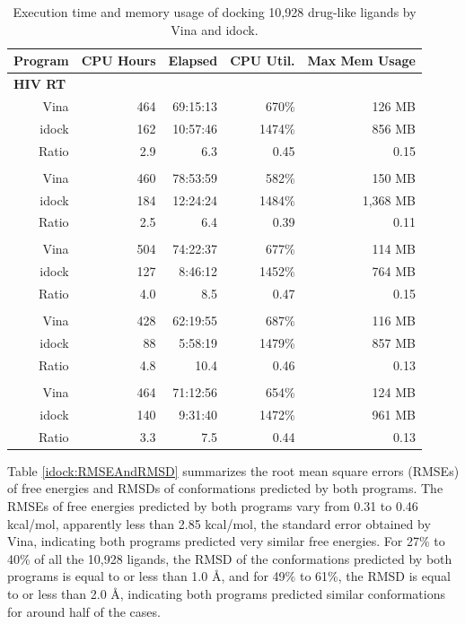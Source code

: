 \begin{table}
\centering
\begin{tabular*}
{\linewidth}
{@{\extracolsep{\fill}}rrrrr}
\toprule
Program & CPU Hours & Elapsed & CPU Util. & Max Mem Usage\\
\midrule
\multicolumn{5}{l}{\textbf{HIV RT}}\\
Vina  & 464 & 69:15:13 &  670\% & 126 MB\\
idock & 162 & 10:57:46 & 1474\% & 856 MB\\
Ratio & 2.9 &      6.3 & 0.45   & 0.15\\
\noalign{\smallskip\smallskip}
\multicolumn{5}{l}{\textbf{SAHH}}\\
Vina  & 460 & 78:53:59 &  582\% &   150 MB\\
idock & 184 & 12:24:24 & 1484\% & 1,368 MB\\
Ratio & 2.5 &      6.4 &  0.39  & 0.11\\
\noalign{\smallskip\smallskip}
\multicolumn{5}{l}{\textbf{ADA}}\\
Vina  & 504 & 74:22:37 &  677\% & 114 MB\\
idock & 127 &  8:46:12 & 1452\% & 764 MB\\
Ratio & 4.0 &      8.5 &  0.47  & 0.15\\
\noalign{\smallskip\smallskip}
\multicolumn{5}{l}{\textbf{PNP}}\\
Vina  & 428 & 62:19:55 &  687\% & 116 MB\\
idock &  88 &  5:58:19 & 1479\% & 857 MB\\
Ratio & 4.8 &     10.4 &  0.46  & 0.13\\
\noalign{\smallskip\smallskip}
\multicolumn{5}{l}{\textbf{Average}}\\
Vina  & 464 & 71:12:56 &  654\% & 124 MB\\
idock & 140 &  9:31:40 & 1472\% & 961 MB\\
Ratio & 3.3 &      7.5 & 0.44   & 0.13\\
\bottomrule
\end{tabular*}
\caption{Execution time and memory usage of docking 10,928 drug-like ligands by Vina and idock.}
\label{idock:ExecutionTimeAndMemoryUsage}
\end{table}

Table \ref{idock:RMSEAndRMSD} summarizes the root mean square errors (RMSEs) of free energies and RMSDs of conformations predicted by both programs. The RMSEs of free energies predicted by both programs vary from 0.31 to 0.46 kcal/mol, apparently less than 2.85 kcal/mol, the standard error obtained by Vina, indicating both programs predicted very similar free energies. For 27\% to 40\% of all the 10,928 ligands, the RMSD of the conformations predicted by both programs is equal to or less than 1.0 \AA, and for 49\% to 61\%, the RMSD is equal to or less than 2.0 \AA, indicating both programs predicted similar conformations for around half of the cases.

